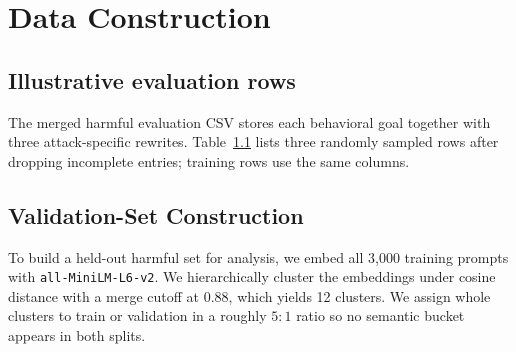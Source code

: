 \documentclass{article}
\begin{document}

\begin{ack}
\end{ack}




\appendix


\section{Data Construction}
\label{app:data}

\subsection{Illustrative evaluation rows}
\label{app:dataset-examples}

The merged harmful evaluation CSV stores each behavioral goal together with three attack-specific rewrites. Table~\ref{app:dataset-examples} lists three randomly sampled rows after dropping incomplete entries; training rows use the same columns.



\subsection{Validation-Set Construction}
\label{app:validation-construction}

To build a held-out harmful set for analysis, we embed all 3{,}000 training prompts with \texttt{all-MiniLM-L6-v2}. We hierarchically cluster the embeddings under cosine distance with a merge cutoff at $0.88$, which yields 12 clusters. We assign whole clusters to train or validation in a roughly $5{:}1$ ratio so no semantic bucket appears in both splits.
\end{document}
